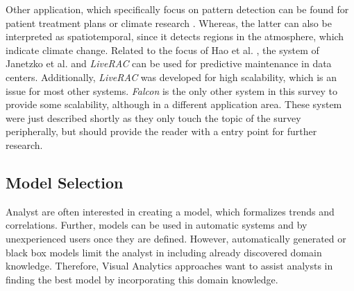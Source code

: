 \documentclass[electronic]{vgtc}             %
\begin{document}
Other application, which specifically focus on pattern detection can be found for patient treatment plans \cite{Gschwandtner:2011} or climate research \cite{Kehrer:2008}.
Whereas, the latter can also be interpreted as spatiotemporal, since it detects regions in the atmosphere, which indicate climate change.
Related to the focus of Hao et al. \cite{Hao:2009, Hao:2011}, the system of Janetzko et al. \cite{janetzko:2014} and \textit{LiveRAC} \cite{McLachlan:2008} can be used for predictive maintenance in data centers.
Additionally, \textit{LiveRAC} was developed for high scalability, which is an issue for most other systems.
\textit{Falcon}  \cite{steed:2017} is the only other system in this survey to provide some scalability, although in a different application area. 
These system were just described shortly as they only touch the topic of the survey peripherally, but should provide the reader with a entry point for further research.

\subsection{Model Selection\label{subsec:selection}}
Analyst are often interested in creating a model, which formalizes trends and correlations.
Further, models can be used in automatic systems and by unexperienced users once they are defined. 
However, automatically generated or black box models limit the analyst in including already discovered domain knowledge. 
Therefore, Visual Analytics approaches want to assist analysts in finding the best model by incorporating this domain knowledge. 
\end{document}
